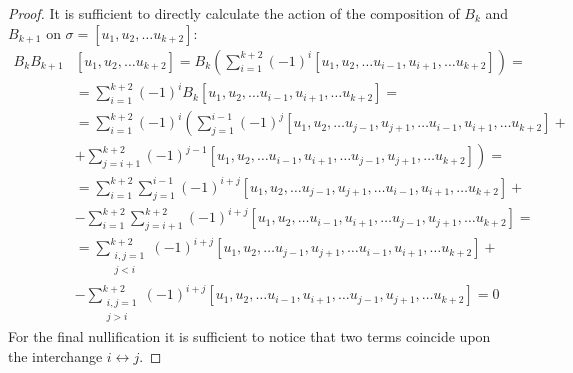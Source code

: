 
\begin{proof}
      It is sufficient to directly calculate the action of the composition of \(B_k\) and \( B_{k+1}\) on \(\sigma = [u_1, u_2, \dots u_{k+2}]\):
      \begin{equation}
            \begin{aligned}
                  B_k B_{k+1} & [ u_1, u_2, \dots u_{k+2} ]  = B_k \left( \sum_{i=1}^{k+2} \left( -1 \right)^i [u_1, u_2, \dots u_{i-1}, u_{i+1}, \dots u_{k+2} ] \right) = \\
                  & =  \sum_{i=1}^{k+2} \left( -1 \right)^i B_k [u_1, u_2, \dots u_{i-1}, u_{i+1}, \dots u_{k+2}] = \\
                  & = \sum_{i=1}^{k+2} \left( -1 \right)^i \left( 
                  \sum_{j=1}^{i-1} (-1)^j [u_1, u_2, \dots u_{j-1}, u_{j+1}, \dots u_{i-1}, u_{i+1}, \dots u_{k+2}] + \right. \\
                  & \left. + \sum_{j=i+1}^{k+2} (-1)^{j-1} [u_1, u_2, \dots u_{i-1}, u_{i+1}, \dots u_{j-1}, u_{j+1}, \dots u_{k+2}] 
                  \right) = 
            \end{aligned}
      \end{equation}
      \begin{equation}
            \begin{aligned}
                  \phantom{B_k B_{k+1}}& = \sum_{i=1}^{k+2}
                  \sum_{j=1}^{i-1} (-1)^{i+j} [u_1, u_2, \dots u_{j-1}, u_{j+1}, \dots u_{i-1}, u_{i+1}, \dots u_{k+2}] + \\
                  &  - \sum_{i=1}^{k+2}\sum_{j=i+1}^{k+2} (-1)^{i+j} [u_1, u_2, \dots u_{i-1}, u_{i+1}, \dots u_{j-1}, u_{j+1}, \dots u_{k+2}] 
                   = \\
                   & = \sum_{\substack{i, j = 1\\ j<i}}^{k+2}
                  (-1)^{i+j} [u_1, u_2, \dots u_{j-1}, u_{j+1}, \dots u_{i-1}, u_{i+1}, \dots u_{k+2}] + \\
                  &  - \sum_{\substack{i, j =1 \\ j>i}}^{k+2} (-1)^{i+j} [u_1, u_2, \dots u_{i-1}, u_{i+1}, \dots u_{j-1}, u_{j+1}, \dots u_{k+2}] 
                   = 0
            \end{aligned}
      \end{equation}
      For the final nullification it is sufficient to notice that two terms coincide upon the interchange \( i \leftrightarrow j\).
\end{proof}

